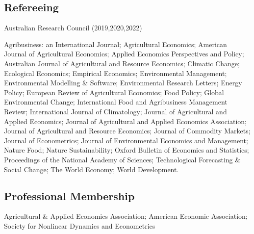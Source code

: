 \documentclass[10pt]{article}
\begin{document}
	\subsection*{Refereeing}
	Australian Research Council (2019,2020,2022)
	
	\medskip
	
	Agribusiness: an International Journal; Agricultural Economics; American Journal of Agricultural Economics; Applied Economics Perspectives and Policy; Australian Journal of Agricultural and Resource Economics; Climatic Change; Ecological Economics; Empirical Economics; Environmental Management; Environmental Modelling \& Software; Environmental Research Letters; Energy Policy; European Review of Agricultural Economics; Food Policy; Global Environmental Change; International Food and Agribusiness Management Review; International Journal of Climatology; Journal of Agricultural and Applied Economics; Journal of Agricultural and Applied Economics Association; Journal of Agricultural and Resource Economics; Journal of Commodity Markets; Journal of Econometrics; Journal of Environmental Economics and Management; Nature Food; Nature Sustainability; Oxford Bulletin of Economics and Statistics; Proceedings of the National Academy of Sciences; Technological Forecasting \& Social Change; The World Economy; World Development.
	
	\subsection*{Professional Membership}
	Agricultural \& Applied Economics Association; 
	American Economic Association; 
	Society for Nonlinear Dynamics and Econometrics
	
	
\end{document}
